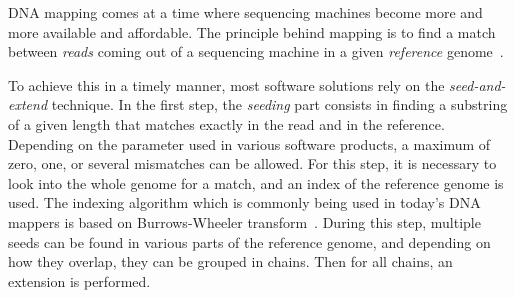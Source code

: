 DNA mapping comes at a time where sequencing machines become more and more available and affordable. The principle behind mapping is to find a match between \emph{reads} coming out of a sequencing machine in a given \emph{reference} genome~\cite{misc:mapping}. 

To achieve this in a timely manner, most software solutions rely on the \emph{seed-and-extend} technique. In the first step, the \emph{seeding} part consists in finding a substring of a given length that matches exactly in the read and in the reference. Depending on the parameter used in various software products, a maximum of zero, one, or several mismatches can be allowed. For this step, it is necessary to look into the whole genome for a match, and an index of the reference genome is used. The indexing algorithm which is commonly being used in today's DNA mappers is based on Burrows-Wheeler transform~\cite{BurrowsWheeler:align}. During this step, multiple seeds can be found in various parts of the reference genome, and depending on how they overlap, they can be grouped in chains. Then for all chains, an extension is performed.


